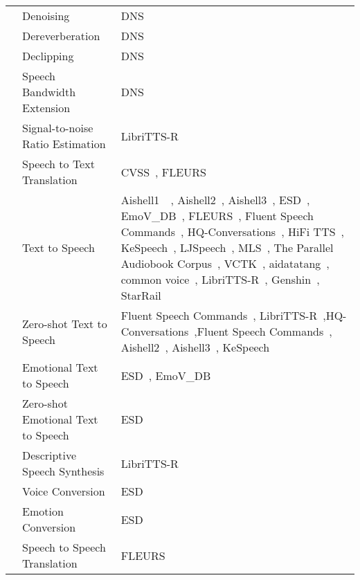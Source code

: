 \begin{longtable}{p{1cm}p{6cm}p{6cm}}
    & Denoising & DNS~\citep{reddy2001interspeech} \\
    \cline{2-3} %
    & Dereverberation & DNS~\citep{reddy2001interspeech} \\
    \cline{2-3} %
    & Declipping & DNS~\citep{reddy2001interspeech} \\
    \cline{2-3} %
    & Speech Bandwidth Extension & DNS ~\citep{reddy2001interspeech} \\
    \cline{2-3} %
    & Signal-to-noise Ratio Estimation & LibriTTS-R~\citep{koizumi2023librittsr} \\
    \cline{2-3} %

    & Speech to Text Translation & CVSS~\citep{jia2022cvss}, FLEURS~\citep{conneau2023fleurs} \\
    \cline{2-3} %
    & Text to Speech & Aishell1~\citep{bu2017aishell}~\citep{bu2017aishell}, Aishell2~\citep{du2018aishell}, Aishell3~\citep{shi2020aishell}, ESD~\citep{zhou2022emotional}, EmoV\_DB~\citep{adigwe2018emotional}, FLEURS~\citep{conneau2023fleurs}, Fluent Speech Commands~\citep{lugosch2019speech}, HQ-Conversations~\citep{xia2024iscslp}, HiFi TTS~\citep{bakhturina2021hi}, KeSpeech~\citep{tang2021kespeech}, LJSpeech~\citep{ljspeech17}, MLS~\citep{Pratap2020MLSAL}, The Parallel Audiobook Corpus~\citep{pacorpus18}, VCTK~\citep{veaux2017cstr}, aidatatang~\citep{aidatatang200zh}, common voice~\citep{ardila2019common}, LibriTTS-R~\citep{koizumi2023librittsr}, Genshin~\citep{genshin_dataset}, StarRail~\citep{starrail_dataset} \\ 
    \cline{2-3}  
    & Zero-shot Text to Speech & Fluent Speech Commands~\citep{lugosch2019speech}, LibriTTS-R~\citep{koizumi2023librittsr},HQ-Conversations~\citep{xia2024iscslp},Fluent Speech Commands~\citep{lugosch2019speech}, Aishell2~\citep{du2018aishell}, Aishell3~\citep{shi2020aishell}, KeSpeech~\citep{tang2021kespeech}  \\
    \cline{2-3} %
    & Emotional Text to Speech & ESD~\citep{zhou2022emotional}, EmoV\_DB~\citep{adigwe2018emotional}  \\
    \cline{2-3} %
    & Zero-shot Emotional Text to Speech & ESD~\citep{zhou2022emotional} \\
    \cline{2-3} %
    & Descriptive Speech Synthesis & LibriTTS-R~\citep{koizumi2023librittsr} \\
    \cline{2-3} %
    & Voice Conversion & ESD~\citep{zhou2022emotional} \\
    \cline{2-3} %
    & Emotion Conversion &  ESD~\citep{zhou2022emotional} \\
    \cline{2-3} %
    & Speech to Speech Translation & FLEURS~\citep{conneau2023fleurs} \\
    \cline{2-3} %
    

\end{longtable}
